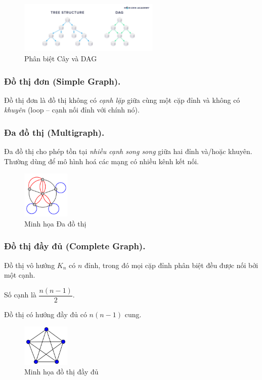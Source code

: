 \documentclass{article}
\begin{document}
\begin{figure}[H]
    \centering
    \includegraphics[width=0.6\textwidth]{img/b1/treevsdag.jpg}
    \caption{Phân biệt Cây và DAG}
\end{figure}

\subsubsection{Đồ thị đơn (Simple Graph).}
Đồ thị đơn là đồ thị không có \emph{cạnh lặp} giữa cùng một cặp đỉnh và không có \emph{khuyên} (loop – cạnh nối đỉnh với chính nó).

\subsubsection{Đa đồ thị (Multigraph).}
Đa đồ thị cho phép tồn tại \emph{nhiều cạnh song song} giữa hai đỉnh và/hoặc khuyên.  
Thường dùng để mô hình hoá các mạng có nhiều kênh kết nối.

\begin{figure}[H]
    \centering
    \includegraphics[width=0.2\textwidth]{img/b1/multigraph.png}
    \caption{Minh họa Đa đồ thị}
    \label{multigraph}
\end{figure}

\subsubsection{Đồ thị đầy đủ (Complete Graph).}
Đồ thị vô hướng \(K_n\) có \(n\) đỉnh, trong đó mọi cặp đỉnh phân biệt đều được nối bởi một cạnh. 

Số cạnh là \(\dfrac{n(n-1)}{2}\).  

Đồ thị có hướng đầy đủ có \(n(n-1)\) cung.

\begin{figure}[H]
    \centering
    \includegraphics[width=0.2\textwidth]{img/b1/CG.png}
    \caption{Minh họa đồ thị đầy đủ}
    \label{CG}
\end{figure}
\end{document}
